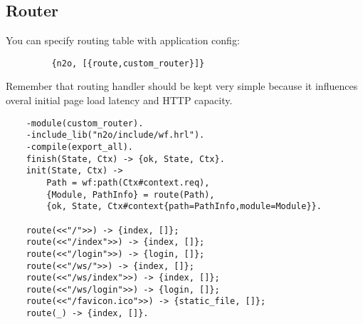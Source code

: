 \newpage
\subsection{Router}
You can specify routing table with application config:

\vspace{1\baselineskip}
\begin{lstlisting}
         {n2o, [{route,custom_router}]}
\end{lstlisting}
\vspace{1\baselineskip}

Remember that routing handler should be kept very simple because it
influences overal initial page load latency and HTTP capacity.

\vspace{1\baselineskip}
\begin{lstlisting}
    -module(custom_router).
    -include_lib("n2o/include/wf.hrl").
    -compile(export_all).
    finish(State, Ctx) -> {ok, State, Ctx}.
    init(State, Ctx) -> 
        Path = wf:path(Ctx#context.req),
        {Module, PathInfo} = route(Path),
        {ok, State, Ctx#context{path=PathInfo,module=Module}}.

    route(<<"/">>) -> {index, []};
    route(<<"/index">>) -> {index, []};
    route(<<"/login">>) -> {login, []};
    route(<<"/ws/">>) -> {index, []};
    route(<<"/ws/index">>) -> {index, []};
    route(<<"/ws/login">>) -> {login, []};
    route(<<"/favicon.ico">>) -> {static_file, []};
    route(_) -> {index, []}.
\end{lstlisting}

